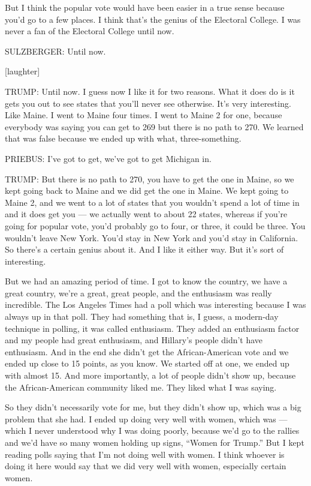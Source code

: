 But I think the popular vote would have been easier in a true sense
because you'd go to a few places. I think that's the genius of the
Electoral College. I was never a fan of the Electoral College until now.

SULZBERGER: Until now.

{[}laughter{]}

TRUMP: Until now. I guess now I like it for two reasons. What it does do
is it gets you out to see states that you'll never see otherwise. It's
very interesting. Like Maine. I went to Maine four times. I went to
Maine 2 for one, because everybody was saying you can get to 269 but
there is no path to 270. We learned that was false because we ended up
with what, three-something.

PRIEBUS: I've got to get, we've got to get Michigan in.

TRUMP: But there is no path to 270, you have to get the one in Maine, so
we kept going back to Maine and we did get the one in Maine. We kept
going to Maine 2, and we went to a lot of states that you wouldn't spend
a lot of time in and it does get you --- we actually went to about 22
states, whereas if you're going for popular vote, you'd probably go to
four, or three, it could be three. You wouldn't leave New York. You'd
stay in New York and you'd stay in California. So there's a certain
genius about it. And I like it either way. But it's sort of interesting.

But we had an amazing period of time. I got to know the country, we have
a great country, we're a great, great people, and the enthusiasm was
really incredible. The Los Angeles Times had a poll which was
interesting because I was always up in that poll. They had something
that is, I guess, a modern-day technique in polling, it was called
enthusiasm. They added an enthusiasm factor and my people had great
enthusiasm, and Hillary's people didn't have enthusiasm. And in the end
she didn't get the African-American vote and we ended up close to 15
points, as you know. We started off at one, we ended up with almost 15.
And more importantly, a lot of people didn't show up, because the
African-American community liked me. They liked what I was saying.

So they didn't necessarily vote for me, but they didn't show up, which
was a big problem that she had. I ended up doing very well with women,
which was --- which I never understood why I was doing poorly, because
we'd go to the rallies and we'd have so many women holding up signs,
``Women for Trump.'' But I kept reading polls saying that I'm not doing
well with women. I think whoever is doing it here would say that we did
very well with women, especially certain women.

